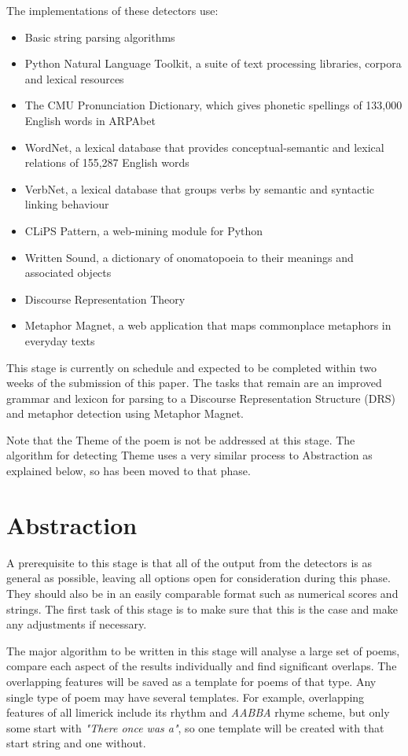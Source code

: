 The implementations of these detectors use:
\begin{itemize}
\setlength{\itemsep}{0pt}
\item{Basic string parsing algorithms}
\item{Python Natural Language Toolkit, a suite of text processing libraries, corpora and lexical resources}
\item{The CMU Pronunciation Dictionary, which gives phonetic spellings of 133,000 English words in ARPAbet}
\item{WordNet, a lexical database that provides conceptual-semantic and lexical relations of 155,287 English words}
\item{VerbNet, a lexical database that groups verbs by semantic and syntactic linking behaviour}
\item{CLiPS Pattern, a web-mining module for Python}
\item{Written Sound, a dictionary of onomatopoeia to their meanings and associated objects}
\item{Discourse Representation Theory}
\item{Metaphor Magnet, a web application that maps commonplace metaphors in everyday texts}
\end{itemize}

This stage is currently on schedule and expected to be completed within two weeks of the submission of this paper. The tasks that remain are an improved grammar and lexicon for parsing to a Discourse Representation Structure (DRS) and metaphor detection using Metaphor Magnet.

Note that the Theme of the poem is not be addressed at this stage. The algorithm for detecting Theme uses a very similar process to Abstraction as explained below, so has been moved to that phase.

\section{Abstraction}

A prerequisite to this stage is that all of the output from the detectors is as general as possible, leaving all options open for consideration during this phase. They should also be in an easily comparable format such as numerical scores and strings. The first task of this stage is to make sure that this is the case and make any adjustments if necessary.

The major algorithm to be written in this stage will analyse a large set of poems, compare each aspect of the results individually and find significant overlaps. The overlapping features will be saved as a template for poems of that type. Any single type of poem may have several templates. For example, overlapping features of all limerick include its rhythm and \textit{AABBA} rhyme scheme, but only some start with \textit{"There once was a"}, so one template will be created with that start string and one without.

